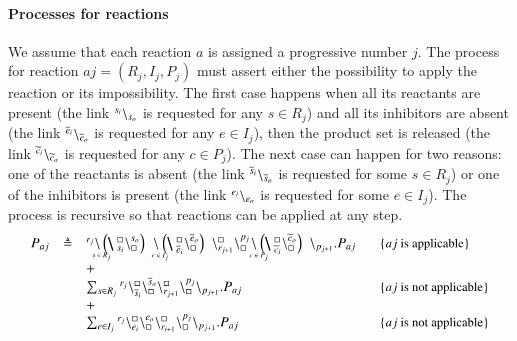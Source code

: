 \paragraph{Processes for reactions}
We assume that each reaction $a$ is assigned a progressive number $j$.
The process for reaction $aj=(R_j,I_j,P_j)$ must assert either the possibility to apply the reaction or its impossibility.
The first case happens when all its reactants are present (the link ${}^{s_i} \backslash_{s_o}$ is requested for any $s\in R_j$) and all its inhibitors are absent (the link ${}^{\overline{e}_i} \backslash_{\overline{e}_o}$ is requested for any $e\in I_j$), then the product set is released (the link ${}^{\widetilde{c}_i} \backslash_{\widetilde{c}_o}$ is requested for any $c\in P_j$).
The next case can happen for two reasons: one of the reactants is absent (the link ${}^{\overline{s}_i} \backslash_{\overline{s}_o}$ is requested for some $s\in R_j$) or one of the inhibitors is present (the link ${}^{e_i} \backslash_{e_o}$ is requested for some $e\in I_j$).
The process is recursive so that reactions can be applied at any step.
\[
\begin{array}{lcl@{\quad}l}
P_{aj}& \defeq & 
 ^{r_j} \backslash  \blockchain{s_i}{s_o}{s \in R_j} \, \link{}{} \blockchain{\overline{e}_i}{\overline{e}_o}{e \in I_j} \, \chainedlink{r_{j+1}}{\noact}\chainedlink{\noact}{p_j}\link{}{} \blockchain{\widetilde{c}_i}{\widetilde{c}_o}{c \in P_j}\, \backslash_{p_{j+1}}.P_{aj} & \mbox{\small  \{$aj$ is applicable\}}\\
&& + \ \\
&& \sum_{s\in R_j}\startchain{r_j}\chainedlink{\overline{s}_i}{\noact}\chainedlink{\noact}{\overline{s}_o} \chainedlink{r_{j+1}}{\noact}\chainedlink{\noact}{p_{j}}\chainend{p_{j+1}}.P_{aj}  & \mbox{\small  \{$aj$ is not applicable\}}\\
&&+\\
&& \sum_{e\in I_j}\startchain{r_j}\chainedlink{e_i}{\noact} \chainedlink{\noact}{e_o} \chainedlink{r_{i+1}}{\noact}\chainedlink{\noact}{p_{j}}\chainend{p_{j+1}}.P_{aj}  & \mbox{\small \{$aj$ is not applicable\}}\\
\end{array}
\]


